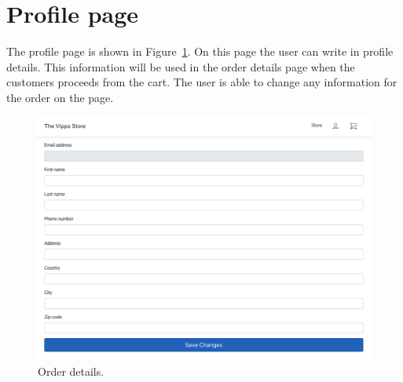 \documentclass[11pt,a4paper,english]{article}
\begin{document}
\section*{Profile page}
The profile page is shown in Figure~\ref{fig:profile}. On this page the user can write in profile details. This information will be used in the order details page when the customers proceeds from the cart. The user is able to change any information for the order on the page.
\begin{figure}[htbp]
  \centering
  \includegraphics[scale=0.2]{profile}
  \caption{Order details.}
  \label{fig:profile}
\end{figure}
\end{document}
